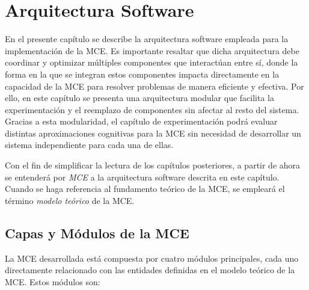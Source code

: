 \chapter{Arquitectura Software}

En el presente capítulo se describe la arquitectura software empleada para la
implementación de la MCE. Es importante resaltar que dicha arquitectura debe
coordinar y optimizar múltiples componentes que interactúan entre sí, donde la forma 
en la que se integran estos componentes impacta directamente en la
capacidad de la MCE para resolver problemas de manera eficiente y efectiva. Por
ello, en este capítulo se presenta una arquitectura modular que facilita la
experimentación y el reemplazo de componentes sin afectar al resto del sistema.
Gracias a esta modularidad, el capítulo de experimentación podrá evaluar
distintas aproximaciones cognitivas para la MCE sin necesidad de desarrollar un
sistema independiente para cada una de ellas.

Con el fin de simplificar la lectura de los capítulos posteriores, a partir de
ahora se entenderá por \emph{MCE} a la arquitectura software descrita en este capítulo.
Cuando se haga referencia al fundamento teórico de la MCE, se empleará el término
\emph{modelo teórico} de la MCE.

\section{Capas y Módulos de la MCE}

La MCE desarrollada está compuesta por cuatro módulos principales, cada uno
directamente relacionado con las entidades definidas en el modelo teórico de la
MCE. Estos módulos son:

